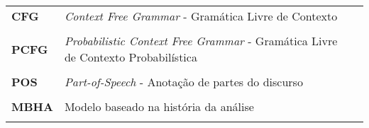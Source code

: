 
\begin{longtable}{llp{12cm}}
{\bf CFG}     &   \emph{Context Free Grammar} - Gramática Livre de Contexto  \\ \\
{\bf PCFG}    &   \emph{Probabilistic Context Free Grammar} - Gramática Livre de Contexto Probabilística\\ \\
{\bf POS}     &   \emph{Part-of-Speech} - Anotação de partes do discurso\\ \\
{\bf MBHA}    &   Modelo baseado na história da análise\\ \\
\end{longtable}
